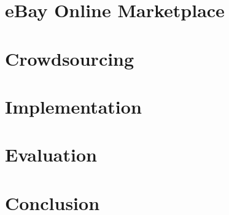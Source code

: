 \documentclass[a4paper]{report}
\begin{document}
\chapter{eBay Online Marketplace}
\label{chap:ebay}


\chapter{Crowdsourcing}
\label{chap:crowdsourcing}


\chapter{Implementation}
\label{chap:implementation}


\chapter{Evaluation}
\label{chap:evaluation}


\chapter{Conclusion}
\label{chap:conclusion}


\clearpage



\newpage
\begin{appendices}

\end{appendices}
\end{document}
